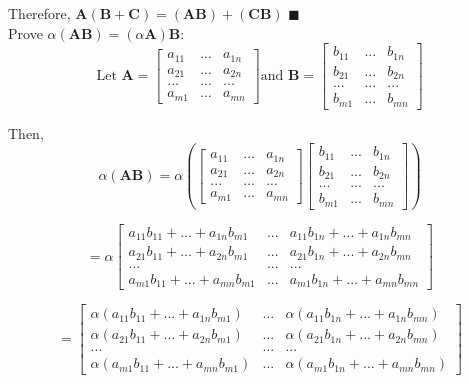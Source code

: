 \documentclass{article}
\newcommand*{\QED}{\hfill\ensuremath{\blacksquare}}
\begin{document}
\begin{enumerate}
		Therefore, $ \textbf{A}(\textbf{B} + \textbf{C}) = (\textbf{AB})+(\textbf{CB}) $ \QED \\
	
	Prove $ \alpha (\textbf{AB}) = (\alpha\textbf{A})\textbf{B} $:
		$$	\text{Let } 
		\textbf{A} = \begin{bmatrix}
		a_{11}  &  ... & a_{1n} \\
		a_{21}  &  ... & a_{2n} \\
		...     &  ... & ...    \\
		a_{m1}  &  ... & a_{mn} 
		\end{bmatrix}  
		\text{and }
		\textbf{B} = \begin{bmatrix}
		b_{11}  &  ... & b_{1n} \\
		b_{21}  &  ... & b_{2n} \\
		...     &  ... & ...    \\
		b_{m1}  &  ... & b_{mn}
		\end{bmatrix}$$
		
		Then, 
		$$\alpha (\textbf{AB}) = \alpha \left( \begin{bmatrix}
		a_{11}  &  ... & a_{1n} \\
		a_{21}  &  ... & a_{2n} \\
		...     &  ... & ...    \\
		a_{m1}  &  ... & a_{mn} 
		\end{bmatrix} \begin{bmatrix}
		b_{11}  &  ... & b_{1n} \\
		b_{21}  &  ... & b_{2n} \\
		...     &  ... & ...    \\
		b_{m1}  &  ... & b_{mn}
		\end{bmatrix} \right)$$
		
		$$= \alpha \begin{bmatrix}
		a_{11} b_{11} + ... + a_{1n} b_{m1} & ... & a_{11} b_{1n} + ... + a_{1n} b_{mn} \\
		a_{21} b_{11} + ... + a_{2n} b_{m1} & ... & a_{21} b_{1n} + ... + a_{2n} b_{mn} \\
		...       &      ...      &      ...      \\
		a_{m1} b_{11} + ... + a_{mn} b_{m1}  & ... & a_{m1} b_{1n} + ... + a_{mn} b_{mn}
		\end{bmatrix} $$
		
		$$ = \begin{bmatrix}
		\alpha(a_{11} b_{11} + ... + a_{1n} b_{m1}) & ... & \alpha(a_{11} b_{1n} + ... + a_{1n} b_{mn}) \\
		\alpha(a_{21} b_{11} + ... + a_{2n} b_{m1}) & ... & \alpha(a_{21} b_{1n} + ... + a_{2n} b_{mn}) \\
		...       &      ...      &      ...      \\
		\alpha(a_{m1} b_{11} + ... + a_{mn} b_{m1})  & ... & \alpha(a_{m1} b_{1n} + ... + a_{mn} b_{mn})
		\end{bmatrix} $$
		

\end{enumerate}
\end{document}
